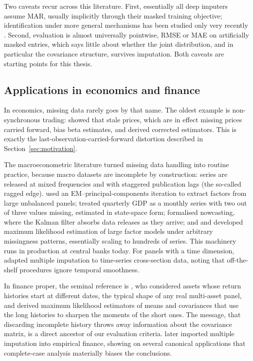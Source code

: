 Two caveats recur across this literature. First, essentially all deep
imputers assume MAR, usually implicitly through their masked training
objective; identification under more general mechanisms has been
studied only very recently \citep{causalview2025}. Second, evaluation
is almost universally pointwise, RMSE or MAE on artificially masked
entries, which says little about whether the joint distribution, and
in particular the covariance structure, survives imputation. Both
caveats are starting points for this thesis.

\subsection{Applications in economics and finance}
\label{sec:lit_finance}

In economics, missing data rarely goes by that name. The oldest
example is non-synchronous trading: \citet{scholes1977} showed that
stale prices, which are in effect missing prices carried forward, bias
beta estimates, and derived corrected estimators. This is exactly the
last-observation-carried-forward distortion described in
Section~\ref{sec:motivation}.

The macroeconometric literature turned missing data handling into
routine practice, because macro datasets are incomplete by
construction: series are released at mixed frequencies and with
staggered publication lags (the so-called ragged edge).
\citet{stock2002} used an EM--principal-components iteration to
extract factors from large unbalanced panels; \citet{mariano2003}
treated quarterly GDP as a monthly series with two out of three values
missing, estimated in state-space form; \citet{giannone2008}
formalised nowcasting, where the Kalman filter absorbs data releases
as they arrive; and \citet{doz2012} and \citet{banbura2014} developed
maximum likelihood estimation of large factor models under arbitrary
missingness patterns, essentially scaling \citet{shumway1982} to
hundreds of series. This machinery runs in production at central
banks today. For panels with a time dimension, \citet{honaker2010}
adapted multiple imputation to time-series cross-section data, noting
that off-the-shelf procedures ignore temporal smoothness.

In finance proper, the seminal reference is \citet{stambaugh1997},
who considered assets whose return histories start at different dates,
the typical shape of any real multi-asset panel, and derived maximum
likelihood estimators of means and covariances that use the long
histories to sharpen the moments of the short ones. The message, that
discarding incomplete history throws away information about the
covariance matrix, is a direct ancestor of our evaluation criteria.
\citet{kofman2003} later imported multiple imputation into empirical
finance, showing on several canonical applications that complete-case
analysis materially biases the conclusions.

